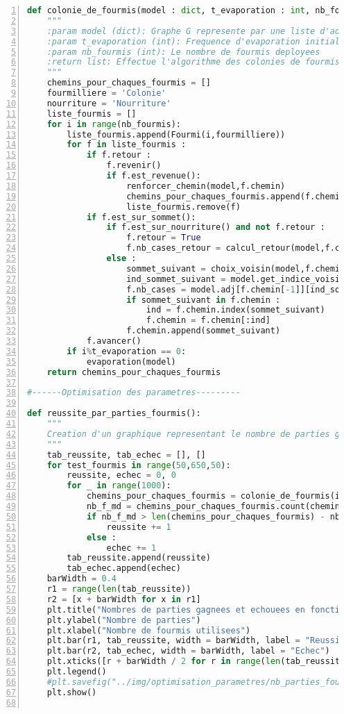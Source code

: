 \documentclass[
12pt,
french,
]{article}
\begin{document}
\begin{lstlisting}[language=Python, numbers=left, label=colonies_fourmis]
def colonie_de_fourmis(model : dict, t_evaporation : int, nb_fourmis : int)->list:
    """
    :param model (dict): Graphe G represente par une liste d'adjacence
    :param t_evaporation (int): Frequence d'evaporation initialise a 8
    :param nb_fourmis (int): Le nombre de fourmis deployees
    :return list: Effectue l'algorithme des colonies de fourmis et renvoie la liste des chemins empruntes par les fourmis
    """
    chemins_pour_chaques_fourmis = []
    fourmilliere = 'Colonie'
    nourriture = 'Nourriture'
    liste_fourmis = []
    for i in range(nb_fourmis):
        liste_fourmis.append(Fourmi(i,fourmilliere))
        for f in liste_fourmis :
            if f.retour :
                f.revenir()
                if f.est_revenue():
                    renforcer_chemin(model,f.chemin)
                    chemins_pour_chaques_fourmis.append(f.chemin)
                    liste_fourmis.remove(f)
            if f.est_sur_sommet():
                if f.est_sur_nourriture() and not f.retour :
                    f.retour = True
                    f.nb_cases_retour = calcul_retour(model,f.chemin)
                else :
                    sommet_suivant = choix_voisin(model,f.chemin[-1])
                    ind_sommet_suivant = model.get_indice_voisin(f.chemin[-1],sommet_suivant)
                    f.nb_cases = model.adj[f.chemin[-1]][ind_sommet_suivant]["nombre de case"]
                    if sommet_suivant in f.chemin :
                        ind = f.chemin.index(sommet_suivant)
                        f.chemin = f.chemin[:ind]
                    f.chemin.append(sommet_suivant)  
            f.avancer()          
        if i%t_evaporation == 0:
            evaporation(model)
    return chemins_pour_chaques_fourmis

#------Optimisation des parametres---------

def reussite_par_parties_fourmis():
    """
    Creation d'un graphique representant le nombre de parties gagnees en fonction du nombre de fourmis
    """
    tab_reussite, tab_echec = [], []
    for test_fourmis in range(50,650,50):
        reussite, echec = 0, 0
        for _ in range(1000):
            chemins_pour_chaques_fourmis = colonie_de_fourmis(initialise_model(l_aretes),t_evaporation, test_fourmis)
            nb_f_md = chemins_pour_chaques_fourmis.count(chemin_gagnant)
            if nb_f_md > len(chemins_pour_chaques_fourmis) - nb_f_md :
                reussite += 1
            else :
                echec += 1
        tab_reussite.append(reussite)
        tab_echec.append(echec)
    barWidth = 0.4
    r1 = range(len(tab_reussite))
    r2 = [x + barWidth for x in r1]
    plt.title("Nombres de parties gagnees et echouees en fonction du nombre de fourmis")
    plt.ylabel("Nombre de parties")
    plt.xlabel("Nombre de fourmis utilisees")
    plt.bar(r1, tab_reussite, width = barWidth, label = "Reussite")
    plt.bar(r2, tab_echec, width = barWidth, label = "Echec")
    plt.xticks([r + barWidth / 2 for r in range(len(tab_reussite))], [nb for nb in range(50,650,50)])
    plt.legend()
    #plt.savefig("../img/optimisation_parametres/nb_parties_fourmis.png")
    plt.show()


\end{lstlisting}
\end{document}
